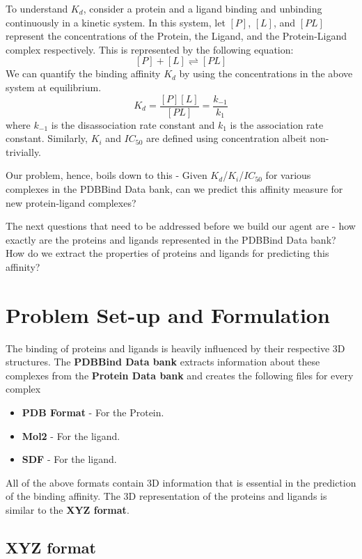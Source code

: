 \documentclass[11pt]{article}
\begin{document}
To understand $K_d$, consider a protein and a ligand binding and unbinding continuously in a kinetic system.
In this system, let $[P]$, $[L]$, and $[PL]$ represent the concentrations of the Protein, the Ligand, and the Protein-Ligand complex respectively.
This is represented by the following equation:
$$[P] + [L] \rightleftharpoons [PL]$$
We can quantify the binding affinity $K_d$ by using the concentrations in the above system at equilibrium.
$$K_d = \frac{[P][L]}{[PL]} = \frac{k_{-1}}{k_1}$$
where $k_{-1}$ is the disassociation rate constant and $k_1$ is the association rate constant.
Similarly, $K_i$ and $IC_{50}$ are defined using concentration albeit non-trivially. 
\cite{binding_affinity_description}

Our problem, hence, boils down to this - Given $K_d$/$K_i$/$IC_{50}$ for various complexes in the PDBBind Data bank,
can we predict this affinity measure for new protein-ligand complexes?

The next questions that need to be addressed before we build our agent are - how exactly are the proteins and ligands represented in the PDBBind Data bank?
How do we extract the properties of proteins and ligands for predicting this affinity?

\section{Problem Set-up and Formulation}

The binding of proteins and ligands is heavily influenced by their respective 3D structures.
The \textbf{PDBBind Data bank} extracts information about these complexes from the \textbf{Protein Data bank} and creates the following files for every complex
\begin{itemize}
\item \textbf{PDB Format} - For the Protein.
\item  \textbf{Mol2} - For the ligand.
\item \textbf{SDF} - For the ligand.
\end{itemize}

All of the above formats contain 3D information that is essential in the prediction of the binding affinity.
The 3D representation of the proteins and ligands is similar to the \textbf{XYZ format}.

\subsection{XYZ format}
\end{document}
